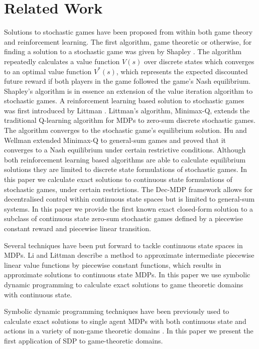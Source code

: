 \section{Related Work}
\label{sec:relatedwork}

Solutions to stochastic games have been proposed from within both
game theory and reinforcement learning. The first algorithm, game theoretic or otherwise, for 
finding a solution to a stochastic game was given by Shapley \cite{Shapley_PotNAoS_1953}.
The algorithm repeatedly calculates a value function $V(s)$ over discrete states
which converges to an optimal value function $V^{*}(s)$, which represents
the expected discounted future reward if both players in the game followed
the game's Nash equilibrium. Shapley's algorithm is in essence an 
extension of the value iteration algorithm to stochastic games. A reinforcement 
learning based solution to stochastic games was first introduced by 
Littman \cite{Littman_ICML_1994}. Littman's algorithm, Minimax-Q,
extends the traditional Q-learning algorithm for MDPs to 
zero-sum discrete stochastic games. The algorithm converges to the 
stochastic game's equilibrium solution. Hu and Wellman \cite{Hu_ICML_1998}
extended Minimax-Q to general-sum games and proved that it converges
to a Nash equilibrium under certain restrictive conditions. Although
both reinforcement learning based algorithms are able to calculate 
equilibrium solutions they are limited to discrete state formulations of
stochastic games. In this paper we calculate exact solutions to 
continuous state formulations of stochastic games, under certain restrictions.
The Dec-MDP \cite{Bernstein_MoOR_2002} framework allows
for decentralised control within continuous state spaces but is limited
to general-sum systems. In this paper we provide the first 
known exact closed-form solution to a subclass of continuous state zero-sum 
stochastic games defined by a piecewise constant reward and piecewise linear transition.

Several techniques have been put forward to tackle continuous state
spaces in MDPs. Li and Littman \cite{Li_AAAI_2005} describe a method
to approximate intermediate piecewise linear value functions by piecewise
constant functions, which results in approximate solutions to continuous
state MDPs. In this paper we use symbolic dynamic programming to
calculate exact solutions to game theoretic domains with continuous state. 

Symbolic dynamic programming techniques have been previously used to calculate
exact solutions to single agent MDPs with both continuous state and actions
in a variety of non-game theoretic domains \cite{Sanner_UAI_2011,Zamani_AAAI_2012}.
In this paper we present the first application of SDP to game-theoretic domains.

